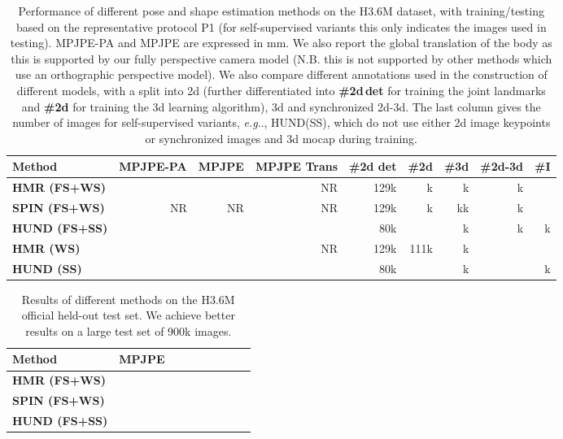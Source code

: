 \documentclass[final]{cvpr}
\makeatletter
\DeclareRobustCommand\onedot{\futurelet\@let@token\@onedot}
\def\@onedot{\ifx\@let@token.\else.\null\fi\xspace}
\def\eg{\emph{e.g}\onedot} \def\Eg{\emph{E.g}\onedot}
\makeatother
\begin{document}
\begin{table*}[!htbp]
    \small
    \centering
    \begin{tabular}[t]{|l||r|r||r||r||r|r|r|r|}
    \hline
    \textbf{Method}  & {MPJPE-PA} & {MPJPE} & {MPJPE Trans} &  {\#2d det} & {\#2d} & {\#3d} & {\#2d-3d}&{\#I}\\ 
    \hline
    \hline
    \textbf{HMR (FS+WS) \cite{Kanazawa2018}} &  & & NR &129k & k &k  &k  &\\
    \hline
    \textbf{SPIN (FS+WS)} \cite{kolotouros2019learning} & NR & NR&NR&129k &k & kk & k &  \\
    \hline
    \textbf{HUND (FS+SS)} &  & &  &80k& &k & k  & k\\
    \hline
\hline
    \textbf{HMR (WS) \cite{Kanazawa2018}} &  & &NR& 129k & 111k &k & &\\
    \hline    
    \textbf{HUND (SS)} &  & &&80k & &k & &k\\
    \hline
\end{tabular}
    \caption{\small Performance of different pose and shape estimation methods on the H3.6M dataset, with training/testing based on the representative protocol P1 (for self-supervised variants this only indicates the images used in testing). MPJPE-PA and MPJPE are expressed in mm. We also report the global translation of the body as this is supported by our fully perspective camera model (N.B. this is not supported by other methods which use an orthographic perspective model). We also compare different annotations used in the construction of different models, with a split into 2d (further differentiated into {\bf \#2d\,det} for training the joint landmarks and {\bf \#2d} for training the 3d learning algorithm), 3d and synchronized 2d-3d. The last column gives the number of images for self-supervised variants, \eg, HUND(SS), which do not use either 2d image keypoints or synchronized images and 3d mocap during training.}
\label{tbl:H36MP1}
\end{table*}

\begin{table}[!htbp]
    \small
    \centering
    \begin{tabular}[t]{|l||r|r||r||r||r|r|r|r|}
    \hline
    \textbf{Method}  & {MPJPE}\\ 
    \hline
    \hline
    \textbf{HMR (FS+WS) \cite{Kanazawa2018}} & \\
    \hline
    \textbf{SPIN (FS+WS)} \cite{kolotouros2019learning} &  \\
    \hline
    \textbf{HUND (FS+SS)} &  \\
    \hline
    \end{tabular}
    \caption{\small Results of different methods on the H3.6M official held-out test set. We achieve better results on a large test set of 900k images.}
\label{tbl:H36MOfficial}
\end{table}
\end{document}
